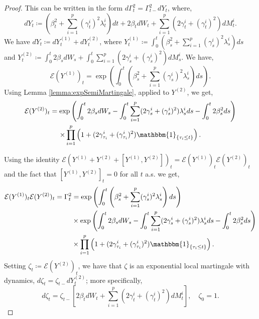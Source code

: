 \documentclass[11pt,a4paper]{article}
\numberwithin{equation}{section}
\theoremstyle{newPlain}
\theoremstyle{newDefinition}
\theoremstyle{newRemark}
\begin{document}
{\begin{proof}
 This can be written in the form $d\Gamma_t^2 = \Gamma_{t-}^2dY_t$, where,
\begin{equation*}
	dY_t \coloneqq \left(\beta_t^2+\sum_{i=1}^p(\gamma_t^i)^2\lambda_t^i\right)dt + 2\beta_tdW_t + \sum_{i=1}^p(2\gamma_t^i + (\gamma_t^i)^2)dM_t^i.
\end{equation*}
We have  $dY_t\coloneqq dY_t^{(1)}+dY_t^{(2)}$, where $Y_t^{(1)}\coloneqq\int_0^t\left(\beta_s^2+\sum_{i=1}^p(\gamma_s^i)^2\lambda_s^i\right)ds$ and $Y_t^{(2)}\coloneqq\int_0^t2\beta_sdW_s+\int_0^t\sum_{i=1}^p(2\gamma_s^i + (\gamma_s^i)^2)dM_s^i$. We have, 
    \begin{equation}
        \mathcal{E}(Y^{(1)})_t = \exp\left(\int_0^t\left(\beta_s^2+\sum_{i=1}^p(\gamma_s^i)^2\lambda_s^i\right)ds\right).
    \end{equation}
    Using Lemma \ref{lemma:expSemiMartingale}, applied to $Y^{(2)}$, we get,
    \begin{multline}
        \mathcal{E}(Y^{(2)})_t = \exp\left(\int_0^t2\beta_sdW_s - \int_0^t\sum_{i=1}^p(2\gamma_s^i+(\gamma_s^i)^2)\lambda_s^ids - \int_0^t2\beta_s^2ds\right)\\\times\prod_{i=1}^p\left(1+(2\gamma_{\tau_i}^i + (\gamma_{\tau_i}^i)^2)\mathbbm{1}_{\{\tau_i\le t\}}\right).
    \end{multline}

    Using the identity $\mathcal{E}(Y^{(1)} + Y^{(2)} + [Y^{(1)},Y^{(2)}])_t = \mathcal{E}(Y^{(1)})_t\mathcal{E}(Y^{(2)})_t$ and the fact that $[Y^{(1)},Y^{(2)}]_t=0$ for all $t$ a.s. we get,
    \begin{equation}\label{eq:PropositionEXM1}
        \begin{aligned}
            \mathcal{E}(Y^{(1)})_t\mathcal{E}(Y^{(2)})_t = \Gamma_t^2&= \exp\left(\int_0^t\left(\beta_s^2+\sum_{i=1}^p(\gamma_s^i)^2\lambda_s^i\right)ds\right)\\
            &\times\exp\left(\int_0^t2\beta_sdW_s - \int_0^t\sum_{i=1}^p(2\gamma_s^i+(\gamma_s^i)^2)\lambda_s^ids - \int_0^t2\beta_s^2ds\right)\\
            &\times\prod_{i=1}^p\left(1+(2\gamma_{\tau_i}^i + (\gamma_{\tau_i}^i)^2)\mathbbm{1}_{\{\tau_i\le t\}}\right).
        \end{aligned}
    \end{equation}
Setting $\zeta_t\coloneqq\mathcal{E}(Y^{(2)})_t$, we have that $\zeta$ is an exponential local martingale with dynamics, $d\zeta_t = \zeta_{t-}dY_t^{(2)}$; more specifically,  
    \begin{equation}\label{eq:PropositionEXM1.5}
        d\zeta_t = \zeta_{t-}\left[2\beta_tdW_t + \sum_{i=1}^p(2\gamma_t^i + (\gamma_t^i)^2)dM_t^i\right],\quad\zeta_0=1.
    \end{equation}
    

\end{proof}}
\end{document}
